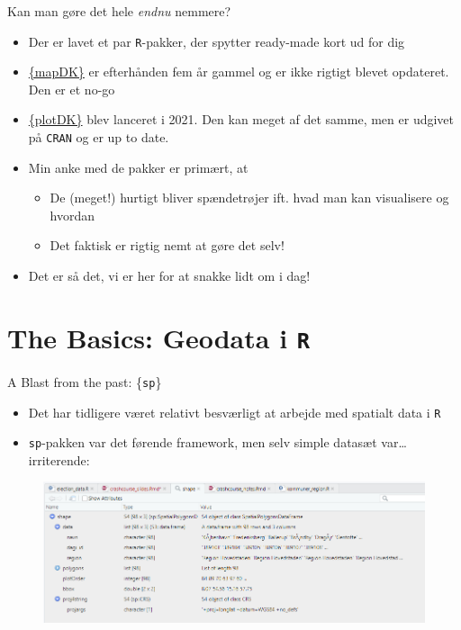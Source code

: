 \documentclass[
  8pt,
  ignorenonframetext,
  aspectratio=169]{beamer}
\begin{document}
\begin{frame}[fragile]{Kan man gøre det hele \emph{endnu} nemmere?}
\protect\hypertarget{kan-man-guxf8re-det-hele-endnu-nemmere}{}
\begin{itemize}
\item
  Der er lavet et par \texttt{R}-pakker, der spytter ready-made kort ud
  for dig
\item
  \href{https://github.com/sebastianbarfort/mapDK}{\{mapDK\}} er
  efterhånden fem år gammel og er ikke rigtigt blevet opdateret. Den er
  et no-go
\item
  \href{https://github.com/kristianSN/plotDK}{\{plotDK\}} blev lanceret
  i 2021. Den kan meget af det samme, men er udgivet på \texttt{CRAN} og
  er up to date.
\item
  Min anke med de pakker er primært, at

  \begin{itemize}
  \item
    De (meget!) hurtigt bliver spændetrøjer ift. hvad man kan
    visualisere og hvordan
  \item
    Det faktisk er rigtig nemt at gøre det selv!
  \end{itemize}
\item
  Det er så det, vi er her for at snakke lidt om i dag!
\end{itemize}
\end{frame}

\hypertarget{the-basics-geodata-i-r}{%
\section{\texorpdfstring{The Basics: Geodata i
\texttt{R}}{The Basics: Geodata i R}}\label{the-basics-geodata-i-r}}

\begin{frame}[fragile]{A Blast from the past: \{\texttt{sp}\}}
\protect\hypertarget{a-blast-from-the-past-sp}{}
\tiny

\normalsize

\begin{itemize}
\item
  Det har tidligere været relativt besværligt at arbejde med spatialt
  data i \texttt{R}
\item
  \texttt{sp}-pakken var det førende framework, men selv simple datasæt
  var\ldots{} irriterende:
\end{itemize}

\begin{figure}[H]
    \centering
    \includegraphics[width=.90\textwidth]{pictures/sp.png}
\end{figure}
\end{frame}
\end{document}
